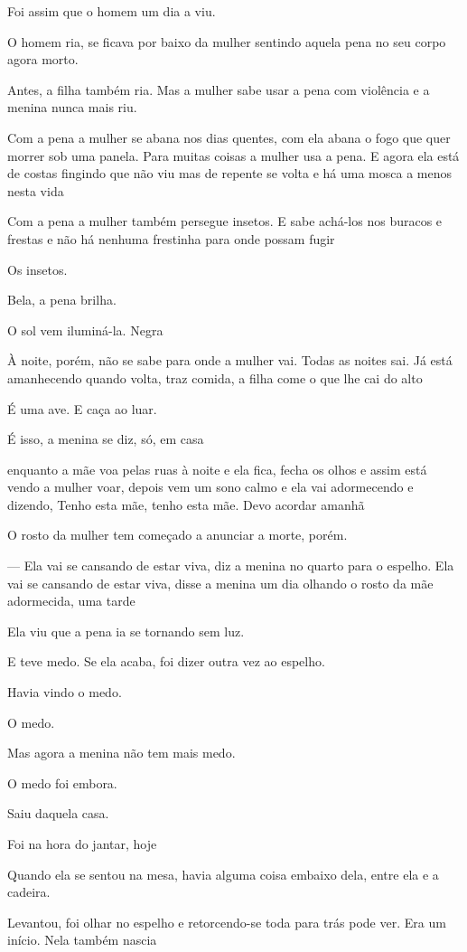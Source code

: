 Foi assim que o homem um dia a viu.

O homem ria, se ficava por baixo da mulher sentindo aquela pena no seu
corpo agora morto.

Antes, a filha também ria. Mas a mulher sabe usar a pena com violência e
a menina nunca mais riu.

Com a pena a mulher se abana nos dias quentes, com ela abana o fogo que
quer morrer sob uma panela. Para muitas coisas a mulher usa a pena. E
agora ela está de costas fingindo que não viu mas de repente se volta e
há uma mosca a menos nesta vida

Com a pena a mulher também persegue insetos. E sabe achá-los nos buracos
e frestas e não há nenhuma frestinha para onde possam fugir

Os insetos.

Bela, a pena brilha.

O sol vem iluminá-la. Negra

À noite, porém, não se sabe para onde a mulher vai. Todas as noites sai.
Já está amanhecendo quando volta, traz comida, a filha come o que lhe
cai do alto

É uma ave. E caça ao luar.

É isso, a menina se diz, só, em casa

enquanto a mãe voa pelas ruas à noite e ela fica, fecha os olhos e assim
está vendo a mulher voar, depois vem um sono calmo e ela vai adormecendo
e dizendo, Tenho esta mãe, tenho esta mãe. Devo acordar amanhã

O rosto da mulher tem começado a anunciar a morte, porém.

--- Ela vai se cansando de estar viva, diz a menina no quarto para o
espelho. Ela vai se cansando de estar viva, disse a menina um dia
olhando o rosto da mãe adormecida, uma tarde

Ela viu que a pena ia se tornando sem luz.

E teve medo. Se ela acaba, foi dizer outra vez ao espelho.

Havia vindo o medo.

O medo.

Mas agora a menina não tem mais medo.

O medo foi embora.

Saiu daquela casa.

Foi na hora do jantar, hoje

Quando ela se sentou na mesa, havia alguma coisa embaixo dela, entre ela
e a cadeira.

Levantou, foi olhar no espelho e retorcendo-se toda para trás pode ver.
Era um início. Nela também nascia

